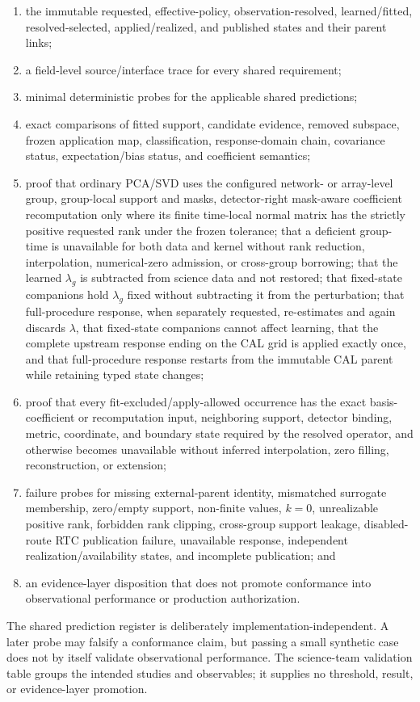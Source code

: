 \documentclass[10pt]{article}
\begin{document}
\begin{enumerate}
\item the immutable requested, effective-policy, observation-resolved,
learned/fitted, resolved-selected, applied/realized, and published states and
their parent links;
\item a field-level source/interface trace for every shared requirement;
\item minimal deterministic probes for the applicable shared predictions;
\item exact comparisons of fitted support, candidate evidence, removed
subspace, frozen application map, classification, response-domain chain,
covariance status, expectation/bias status, and coefficient semantics;
\item proof that ordinary PCA/SVD uses the configured network- or array-level
group, group-local support and masks, detector-right mask-aware coefficient
recomputation only where its finite time-local normal matrix has the strictly
positive requested rank under the frozen tolerance; that a deficient
group-time is unavailable for both data and kernel without rank reduction,
interpolation, numerical-zero admission, or cross-group borrowing; that the learned
$\lambda_g$ is subtracted from science data and not restored; that fixed-state
companions hold $\lambda_g$ fixed without subtracting it from the perturbation;
that full-procedure response, when separately requested, re-estimates and
again discards $\lambda$,
that fixed-state companions cannot affect learning, that the complete upstream response ending on the CAL
grid is applied exactly once, and
that full-procedure response restarts from the immutable CAL parent while
retaining typed state changes;
\item proof that every fit-excluded/apply-allowed occurrence has the exact
basis-coefficient or recomputation input, neighboring support, detector
binding, metric, coordinate, and boundary state required by the resolved
operator, and otherwise becomes unavailable without inferred interpolation,
zero filling, reconstruction, or extension;
\item failure probes for missing external-parent identity, mismatched
surrogate membership, zero/empty support, non-finite values, $k=0$,
unrealizable positive rank, forbidden rank clipping, cross-group support
leakage, disabled-route RTC publication failure, unavailable response,
independent realization/availability states, and incomplete publication; and
\item an evidence-layer disposition that does not promote conformance into
observational performance or production authorization.
\end{enumerate}

The shared prediction register is deliberately implementation-independent.
A later probe may falsify a conformance claim, but passing a small synthetic
case does not by itself validate observational performance. The science-team
validation table groups the intended studies and observables; it supplies no
threshold, result, or evidence-layer promotion.

\clearpage






\end{document}
